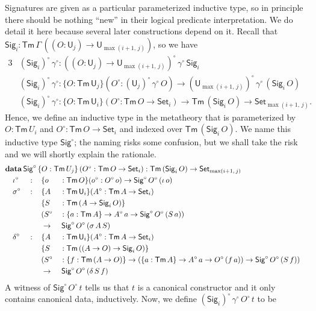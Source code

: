 \documentclass[acmsmall,screen,review,anonymous]{acmart}
\newcommand{\msf}[1]{{\mathsf{#1}}}
\newcommand{\mbf}[1]{{\mathbf{#1}}}
\newcommand{\data}{\mbf{data}}
\newcommand{\U}{\msf{U}}
\newcommand{\Set}{\msf{Set}}
\newcommand{\Sig}{\msf{Sig}}
\newcommand{\Tm}{\msf{Tm}}
\newcommand{\w}{\circ}
\begin{document}
Signatures are given as a particular parameterized inductive type, so in principle there should be
nothing ``new'' in their logical predicate interpretation. We do detail it here because several
later constructions depend on it. Recall that $\Sig_i : \Tm\,\Gamma\,((O : \U_j) \to \U_{\max(i+1,\,j)})$, so we have
\begin{alignat*}{3}
  &(\Sig_i)^\w\,\gamma^\w : ((O : \U_j) \to \U_{\max(i+1,\,j)})^\w\,\gamma^\w\,\Sig_i\\
  &(\Sig_i)^\w\,\gamma^\w : \{O : \Tm\,\U_j\}(O^\w : (\U_j)^\w\,\gamma^\w\,O) \to (\U_{\max(i+1,\,j)})^\w\,\gamma^\w\,(\Sig_i\,O)\\
  &(\Sig_i)^\w\,\gamma^\w : \{O : \Tm\,\U_i\}(O^\w : \Tm\,O \to \Set_i) \to \Tm\,(\Sig_i\,O) \to \Set_{\max(i+1,\,j)}.
\end{alignat*}
Hence, we define an inductive type in the metatheory that is parameterized by $O : \Tm\,U_i$ and
$O^\w : \Tm\,O \to \Set_i$ and indexed over $\Tm\,(\Sig_i\,O)$. We name this inductive type
$\Sig^\w$; the naming risks some confusion, but we shall take the risk and we will shortly
explain the rationale.
\begin{alignat*}{4}
  &\rlap{$\data\,\Sig^\w\,\{O : \Tm\,U_j\}\,(O^\w : \Tm\,O \to \Set_i)  : \Tm\,(\Sig_i\,O) \to \Set_{\max(i+1,\,j)}$}\\
  &\quad \iota^\w  &&:\,&&\{o &&: \Tm\,O\}(o^\w : O^\w\,o) \to \Sig^\w\,O^\w\,(\iota\,o)\\
  &\quad \sigma^\w &&:\,&&\{A &&: \Tm\,\U_i\}(A^\w : \Tm\,A \to \Set_i)\\
  &               && &&\{S &&: \Tm\,(A \to \Sig_i\,O)\}\\
  &               && && (S^\w &&: \{a : \Tm\,A\} \to A^\w\,a \to \Sig^\w\,O^\w\,(S\,a))\\
  &               && && \to &&\,\Sig^\w\,O^\w\,(\sigma\,A\,S)\\
  &\quad \delta^\w &&:\,&&\{A &&: \Tm\,\U_i\}(A^\w : \Tm\,A \to \Set_i)\\
  &               &&   && \{S &&: \Tm\,((A \to O) \to \Sig_i\,O)\}\\
  &               &&   && (S^\w &&: \{f : \Tm\,(A \to O)\} \to (\{a : \Tm\,A\} \to A^\w\,a \to O^\w\,(f\,a)) \to \Sig^\w\,O^\w\,(S\,f))\\
  &\quad          &&   && \to &&\,\Sig^\w\,O^\w\,(\delta\,S\,f)
\end{alignat*}
A witness of $\Sig^\w\,O^\w\,t$ tells us that $t$ is a canonical constructor and it only contains
canonical data, inductively. Now, we define $(\Sig_i)^\w\,\gamma^\w\,O^\w\,t$ to be
\end{document}
